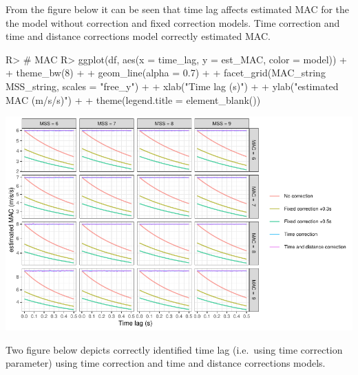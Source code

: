 \documentclass[
]{jss}
\begin{document}
From the figure below it can be seen that time lag affects estimated MAC for the the model without correction and fixed correction models. Time correction and time and distance corrections model correctly estimated MAC.

\begin{CodeChunk}
\begin{CodeInput}
R> # MAC
R> ggplot(df, aes(x = time_lag, y = est_MAC, color = model)) +
+   theme_bw(8) +
+   geom_line(alpha = 0.7) +
+   facet_grid(MAC_string ~ MSS_string, scales = "free_y") +
+   xlab("Time lag (s)") +
+   ylab("estimated MAC (m/s/s)") +
+   theme(legend.title = element_blank())
\end{CodeInput}


\begin{center}\includegraphics[width=1\linewidth]{paper_files/figure-latex/unnamed-chunk-44-1} \end{center}

\end{CodeChunk}

Two figure below depicts correctly identified time lag (i.e.~using time correction parameter) using time correction and time and distance corrections models.
\end{document}
